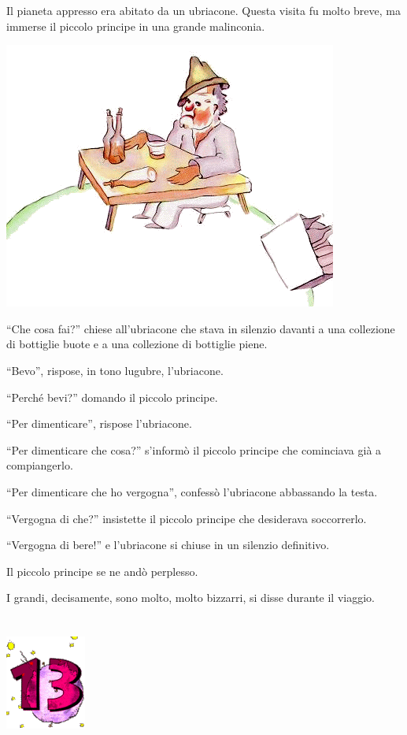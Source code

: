 \documentclass[11pt]{scrbook}
\begin{document}
Il pianeta appresso era abitato da un ubriacone. Questa visita fu molto breve, ma immerse il piccolo principe in una grande malinconia.

\begin{center}
\includegraphics{img/12a}
\end{center}

``Che cosa fai?'' chiese all'ubriacone che stava in silenzio davanti a una collezione di bottiglie buote e a una collezione di bottiglie piene.

``Bevo'', rispose, in tono lugubre, l'ubriacone.

``Perché bevi?'' domando il piccolo principe.

``Per dimenticare'', rispose l'ubriacone.

``Per dimenticare che cosa?'' s'informò il piccolo principe che cominciava già a compiangerlo.

``Per dimenticare che ho vergogna'', confessò l'ubriacone abbassando la testa.

``Vergogna di che?'' insistette il piccolo principe che desiderava soccorrerlo.

``Vergogna di bere!'' e l'ubriacone si chiuse in un silenzio definitivo.

Il piccolo principe se ne andò perplesso.

I grandi, decisamente, sono molto, molto bizzarri, si disse durante il viaggio.

\chapter{}
\begin{center}
\includegraphics{img/chapter13}
\end{center}
\end{document}
